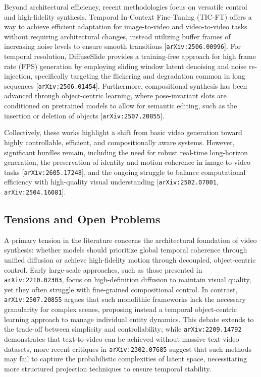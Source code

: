 \documentclass[11pt]{article}
\begin{document}
Beyond architectural efficiency, recent methodologies focus on versatile control and high-fidelity synthesis. Temporal In-Context Fine-Tuning (TIC-FT) offers a way to achieve efficient adaptation for image-to-video and video-to-video tasks without requiring architectural changes, instead utilizing buffer frames of increasing noise levels to ensure smooth transitions [\texttt{arXiv:2506.00996}]. For temporal resolution, DiffuseSlide provides a training-free approach for high frame rate (FPS) generation by employing sliding window latent denoising and noise re-injection, specifically targeting the flickering and degradation common in long sequences [\texttt{arXiv:2506.01454}]. Furthermore, compositional synthesis has been advanced through object-centric learning, where pose-invariant slots are conditioned on pretrained models to allow for semantic editing, such as the insertion or deletion of objects [\texttt{arXiv:2507.20855}].

Collectively, these works highlight a shift from basic video generation toward highly controllable, efficient, and compositionally aware systems. However, significant hurdles remain, including the need for robust real-time long-horizon generation, the preservation of identity and motion coherence in image-to-video tasks [\texttt{arXiv:2605.17248}], and the ongoing struggle to balance computational efficiency with high-quality visual understanding [\texttt{arXiv:2502.07001}, \texttt{arXiv:2504.16081}].

\subsection{Tensions and Open Problems}

A primary tension in the literature concerns the architectural foundation of video synthesis: whether models should prioritize global temporal coherence through unified diffusion or achieve high-fidelity motion through decoupled, object-centric control. Early large-scale approaches, such as those presented in \texttt{arXiv:2210.02303}, focus on high-definition diffusion to maintain visual quality, yet they often struggle with fine-grained compositional control. In contrast, \texttt{arXiv:2507.20855} argues that such monolithic frameworks lack the necessary granularity for complex scenes, proposing instead a temporal object-centric learning approach to manage individual entity dynamics. This debate extends to the trade-off between simplicity and controllability; while \texttt{arXiv:2209.14792} demonstrates that text-to-video can be achieved without massive text-video datasets, more recent critiques in \texttt{arXiv:2302.07685} suggest that such methods may fail to capture the probabilistic complexities of latent space, necessitating more structured projection techniques to ensure temporal stability.
\end{document}
